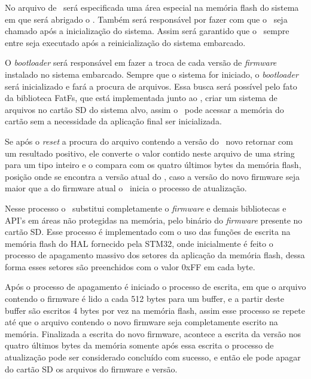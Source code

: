 No arquivo de \linker\ será especificada uma área especial na memória flash do sistema em que será abrigado o \bootloader. Também será responsável por fazer com que o \bootloader\ seja chamado após a inicialização do sistema. Assim será garantido que o \bootloader\ sempre entre seja executado após a reinicialização do sistema embarcado.


O \textit{bootloader} será responsável em fazer a troca de cada versão de \textit{firmware} instalado no sistema embarcado. Sempre que o sistema for iniciado, o \textit{bootloader} será inicializado e fará a procura de arquivos. Essa busca será possível pelo fato da biblioteca FatFs, que está implementada junto ao \bootloader, criar um sistema de arquivos no cartão SD do sistema alvo, assim o \bootloader\ pode acessar a memória do cartão sem a necessidade da aplicação final ser inicializada.

Se após o \textit{reset} a procura do arquivo contendo a versão do \firmware\ novo retornar com um resultado positivo, ele converte o valor contido neste arquivo de uma string para um tipo inteiro e o compara com os quatro últimos bytes da memória flash, posição onde se encontra a versão atual do \firmware , caso a versão do novo firmware seja maior que a do firmware atual o \bootloader\ inicia o processo de atualização.

Nesse processo o \bootloader\ substitui completamente o \textit{firmware} e demais bibliotecas e API's em áreas não protegidas na memória, pelo binário do \textit{firmware} presente no cartão SD. Esse processo é implementado com o uso das funções de escrita na memória flash do HAL fornecido pela STM32, onde inicialmente é feito o processo de apagamento massivo dos setores da aplicação da memória flash, dessa forma esses setores são preenchidos com o valor 0xFF em cada byte.

Após o processo de apagamento é iniciado o processo de escrita, em que o arquivo contendo o firmware é lido a cada 512 bytes para um buffer, e a partir deste buffer são escritos 4 bytes por vez na memória flash, assim esse processo se repete até que o arquivo contendo o novo firmware seja completamente escrito na memória.
Finalizada a escrita do novo firmware, acontece a escrita da versão nos quatro últimos bytes da memória somente após essa escrita o processo de atualização pode ser considerado concluído com sucesso, e então ele pode apagar do cartão SD os arquivos do firmware e versão.

